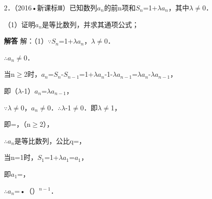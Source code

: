 2．（2016•新课标Ⅲ）已知数列{\ensuremath{a_{n}}}的前n项和\ensuremath{S_{n}}=1+\ensuremath{\lambda}\ensuremath{a_{n}}，其中\ensuremath{\lambda}\ensuremath{\ne}0．\par
（1）证明{\ensuremath{a_{n}}}是等比数列，并求其通项公式；\par
\QuestionSpace{3.5cm}
\ifshowanswers
\par\begingroup\color{solutioncolor}\noindent\textbf{解答}\quad
解：（1）\ensuremath{\because}\ensuremath{S_{n}}=1+\ensuremath{\lambda}\ensuremath{a_{n}}，\ensuremath{\lambda}\ensuremath{\ne}0．\par
\ensuremath{\therefore}\ensuremath{a_{n}}\ensuremath{\ne}0．\par
当n\ensuremath{\ge}2时，\ensuremath{a_{n}}=\ensuremath{S_{n}}-\ensuremath{S_{n-1}}=1+\ensuremath{\lambda}\ensuremath{a_{n}}-1-\ensuremath{\lambda}\ensuremath{a_{n-1}}=\ensuremath{\lambda}\ensuremath{a_{n}}-\ensuremath{\lambda}\ensuremath{a_{n-1}}，\par
即（\ensuremath{\lambda}-1）\ensuremath{a_{n}}=\ensuremath{\lambda}\ensuremath{a_{n-1}}，\par
\ensuremath{\because}\ensuremath{\lambda}\ensuremath{\ne}0，\ensuremath{a_{n}}\ensuremath{\ne}0．\ensuremath{\therefore}\ensuremath{\lambda}-1\ensuremath{\ne}0．即\ensuremath{\lambda}\ensuremath{\ne}1，\par
即=，（n\ensuremath{\ge}2），\par
\ensuremath{\therefore}{\ensuremath{a_{n}}}是等比数列，公比q=，\par
当n=1时，\ensuremath{S_{1}}=1+\ensuremath{\lambda}\ensuremath{a_{1}}=\ensuremath{a_{1}}，\par
即\ensuremath{a_{1}}=，\par
\ensuremath{\therefore}\ensuremath{a_{n}}=•（）\ensuremath{{}^{n-1}}．\par
\par\endgroup\fi


